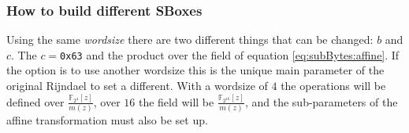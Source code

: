 \documentclass[10pt,a4paper,twoside]{llncs}
\newcommand{\Fpn}[2]{\ensuremath{\mathbb{F}_{#1^#2}}}
\newcommand{\Fpnm}[2]{\ensuremath{\frac{\Fpn{2}{#1}[#2]}{m(#2)}}}
\begin{document}
\subsubsection{How to build different SBoxes}\label{sec:sbox}

Using the same \emph{wordsize} there are two different things that can be changed: $b$ and $c$. The $c=$\texttt{0x63} and the product over the field of equation \ref{eq:subBytes:affine}. If the option is to use another wordsize this is the unique main parameter of the original Rijndael to set a different. With a wordsize of $4$ the operations will be defined over \Fpnm{4}{z}, over $16$ the field will be \Fpnm{{16}}{z}, and the sub-parameters of the affine transformation must also be set up.
\end{document}
